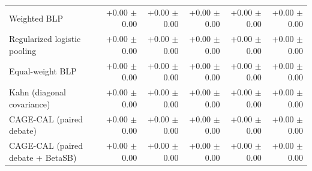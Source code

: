\begin{tabular}{lrrrrr}
Weighted BLP & +0.00 {\scriptsize $\pm$ 0.00} & +0.00 {\scriptsize $\pm$ 0.00} & +0.00 {\scriptsize $\pm$ 0.00} & +0.00 {\scriptsize $\pm$ 0.00} & +0.00 {\scriptsize $\pm$ 0.00} \\
Regularized logistic pooling & +0.00 {\scriptsize $\pm$ 0.00} & +0.00 {\scriptsize $\pm$ 0.00} & +0.00 {\scriptsize $\pm$ 0.00} & +0.00 {\scriptsize $\pm$ 0.00} & +0.00 {\scriptsize $\pm$ 0.00} \\
Equal-weight BLP & +0.00 {\scriptsize $\pm$ 0.00} & +0.00 {\scriptsize $\pm$ 0.00} & +0.00 {\scriptsize $\pm$ 0.00} & +0.00 {\scriptsize $\pm$ 0.00} & +0.00 {\scriptsize $\pm$ 0.00} \\
Kahn (diagonal covariance) & +0.00 {\scriptsize $\pm$ 0.00} & +0.00 {\scriptsize $\pm$ 0.00} & +0.00 {\scriptsize $\pm$ 0.00} & +0.00 {\scriptsize $\pm$ 0.00} & +0.00 {\scriptsize $\pm$ 0.00} \\
CAGE-CAL (paired debate) & +0.00 {\scriptsize $\pm$ 0.00} & +0.00 {\scriptsize $\pm$ 0.00} & +0.00 {\scriptsize $\pm$ 0.00} & +0.00 {\scriptsize $\pm$ 0.00} & +0.00 {\scriptsize $\pm$ 0.00} \\
CAGE-CAL (paired debate + BetaSB) & +0.00 {\scriptsize $\pm$ 0.00} & +0.00 {\scriptsize $\pm$ 0.00} & +0.00 {\scriptsize $\pm$ 0.00} & +0.00 {\scriptsize $\pm$ 0.00} & +0.00 {\scriptsize $\pm$ 0.00} \\
\bottomrule
\end{tabular}

